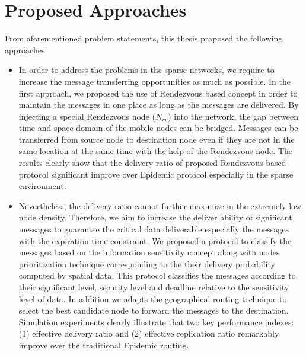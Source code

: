 \section{Proposed Approaches}
\label{intro:Proposed Approaches}
From aforementioned problem statements, this thesis proposed the following approaches:

\begin{itemize}
\item %
In order to address the problems in the sparse networks, we require to increase the message transferring opportunities as much as possible.
%
In the first approach, we proposed the use of Rendezvous based concept in order to maintain the messages in one place as long as the messages are delivered. 
%
By injecting a special Rendezvous node ($N_{rv}$) into the network, the gap between time and space domain of the mobile nodes can be bridged. 
%
Messages can be transferred from source node to destination node even if they are not in the same location at the same time with the help of the Rendezvous node.
% 
The results clearly show that the delivery ratio of proposed Rendezvous based protocol significant improve over Epidemic protocol especially in the sparse environment.

\item %
Nevertheless, the delivery ratio cannot further maximize in the extremely low node density.
%
Therefore, we aim to increase the deliver ability of significant messages to guarantee the critical data deliverable especially the messages with the expiration time constraint. 
%
We proposed a protocol to classify the messages based on the information sensitivity concept along with nodes prioritization technique corresponding to the their delivery probability computed by spatial data. 
%
This protocol classifies the messages according to their significant level, security level and deadline relative to the sensitivity level of data.
% 
In addition we adapts the geographical routing technique to select the best candidate node to forward the messages to the destination. 
%
Simulation experiments clearly illustrate that two key performance indexes: (1) effective delivery ratio and (2) effective replication ratio remarkably improve over the traditional Epidemic routing. 
\end{itemize}

